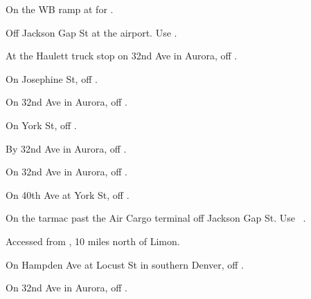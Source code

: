 

\begin{LocationList}

On the WB ramp at   for .

Off Jackson Gap St at the airport. Use  .

At the Haulett truck stop on 32nd Ave in Aurora, off  .

\Location{\GarageHQ \Garage}
On Josephine St, off  .

On 32nd Ave in Aurora, off  .

On York St, off  .

\Location{\RecruitmentAgency \Recruitment}
By 32nd Ave in Aurora, off  .

On 32nd Ave in Aurora, off  .

On 40th Ave at York St, off  .

On the tarmac past the Air Cargo terminal off Jackson Gap St. Use~ .

Accessed from , 10 miles north of Limon.

On  Hampden Ave at Locust St in southern Denver, off  .

On 32nd Ave in Aurora, off  .

\end{LocationList}
